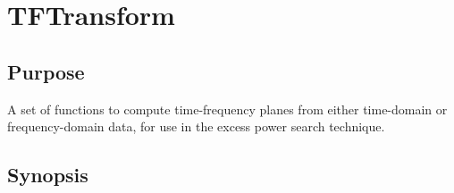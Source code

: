 \documentclass{article}
\begin{document}
\section{TFTransform}

\subsection{Purpose}

A set of functions to compute time-frequency planes from either
time-domain or frequency-domain data, for use in the excess
power search technique.   


 
\subsection{Synopsis}

\end{document}
